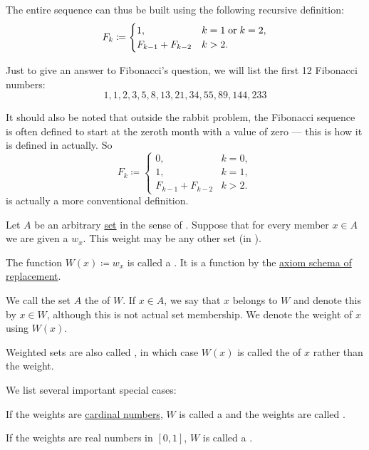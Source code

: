 \begin{example}
  The entire sequence can thus be built using the following recursive definition:
  \begin{equation*}
    F_k \coloneqq \begin{cases}
      1,                &k = 1 \T{or} k = 2, \\
      F_{k-1} + F_{k-2} &k > 2.
    \end{cases}
  \end{equation*}

  Just to give an answer to Fibonacci's question, we will list the first 12 Fibonacci numbers:
  \begin{equation*}
    1, 1, 2, 3, 5, 8, 13, 21, 34, 55, 89, 144, 233
  \end{equation*}

  It should also be noted that outside the rabbit problem, the Fibonacci sequence is often defined to start at the zeroth month with a value of zero --- this is how it is defined in  actually. So
  \begin{equation}\label{eq:ex:fibonacci_rabbits}
    F_k \coloneqq \begin{cases}
      0,                &k = 0, \\
      1,                &k = 1, \\
      F_{k-1} + F_{k-2} &k > 2.
    \end{cases}
  \end{equation}
  is actually a more conventional definition.
\end{example}

\begin{definition}\label{def:weighted_set}
  Let \( A \) be an arbitrary \hyperref[def:set]{set} in the sense of \hyperref[def:zfc]{}. Suppose that for every member \( x \in A \) we are given a  \( w_x \). This weight may be any other set (in ).

  The function \( W(x) \coloneqq w_x \) is called a . It is a function by the \hyperref[def:zfc/replacement]{axiom schema of replacement}.

  We call the set \( A \) the  of \( W \). If \( x \in A \), we say that \( x \) belongs to \( W \) and denote this by \( x \in W \), although this is not actual set membership. We denote the weight of \( x \) using \( W(x) \).

  Weighted sets are also called , in which case \( W(x) \) is called the  of \( x \) rather than the weight.

  We list several important special cases:
  \begin{thmenum}
     If the weights are \hyperref[def:cardinal]{cardinal numbers}, \( W \) is called a  and the weights are called .

     If the weights are real numbers in \( [0, 1] \), \( W \) is called a .
  \end{thmenum}
\end{definition}

